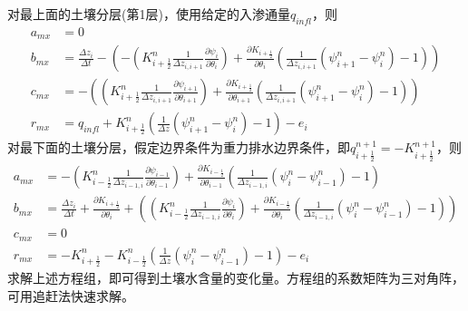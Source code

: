 对最上面的土壤分层(第1层)，使用给定的入渗通量$q_{infl}$，则
\begin{equation}
\begin{aligned}
a_{mx} &= 0 \\
b_{mx} &= \frac{\Delta z_{i}}{\Delta t}-\left(-\left(K_{i+\frac{1}{2}}^{n} 
    \frac{1}{\Delta z_{i, i+1}} \frac{\partial \psi_{i}}{\partial \theta_{i}}\right)+\frac{\partial K_{i+\frac{1}{2}}}{\partial \theta_{i}}\left(\frac{1}{\Delta z_{i, i+1}}
    \left(\psi_{i+1}^{n}-\psi_{i}^{n}\right)-1\right)\right) \\
c_{mx} &= -\left(\left(K_{i+\frac{1}{2}}^{n} \frac{1}{\Delta z_{i, i+1}} 
    \frac{\partial \psi_{i+1}}{\partial \theta_{i+1}}\right)+\frac{\partial K_{i+\frac{1}{2}}}{\partial \theta_{i+1}}\left(\frac{1}{\Delta z_{i, i+1}}
    \left(\psi_{i+1}^{n}-\psi_{i}^{n}\right)-1\right)\right) \\ 
r_{mx} &= q_{i n f l}+K_{i+\frac{1}{2}}^{n}
    \left(\frac{1}{\Delta z}\left(\psi_{i+1}^{n}-\psi_{i}^{n}\right)-1\right)-e_{i}
\end{aligned}
\end{equation}
对最下面的土壤分层，假定边界条件为重力排水边界条件，即$q_{i+\frac{1}{2}}^{n+1}=-K_{i+\frac{1}{2}}^{n+1}$，则
\begin{equation}
\begin{aligned}
a_{mx} &= -\left(K_{i-\frac{1}{2}}^{n} \frac{1}{\Delta z_{i-1, i}} \frac{\partial \psi_{i-1}}
    {\partial \theta_{i-1}}\right)+\frac{\partial K_{i-\frac{1}{2}}}{\partial \theta_{i-1}}\left(\frac{1}{\Delta z_{i-1, i}}
    \left(\psi_{i}^{n}-\psi_{i-1}^{n}\right)-1\right) \\
b_{mx} &= \frac{\Delta z_{i}}{\Delta t}+\frac{\partial K_{i+\frac{1}{2}}}
    {\partial \theta_{i}}+\left(\left(K_{i-\frac{1}{2}}^{n} \frac{1}{\Delta z_{i-1, i}} \frac{\partial \psi_{i}}{\partial \theta_{i}}\right)+
    \frac{\partial K_{i-\frac{1}{2}}}{\partial \theta_{i}}\left(\frac{1}{\Delta z_{i-1, i}}\left(\psi_{i}^{n}-\psi_{i-1}^{n}\right)-1\right)\right) \\
c_{mx} &= 0 \\
r_{mx} &= -K_{i+\frac{1}{2}}^{n}-K_{i-\frac{1}{2}}^{n}\left(\frac{1}{\Delta z}\left(\psi_{i}^{n}-\psi_{i-1}^{n}\right)-1\right)-e_{i}
\end{aligned}
\end{equation}
求解上述方程组，即可得到土壤水含量的变化量。方程组的系数矩阵为三对角阵，可用追赶法快速求解。


